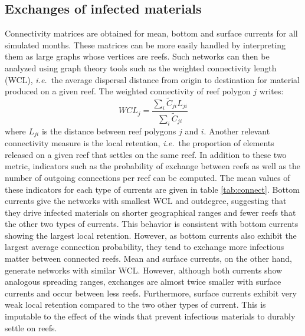 \documentclass[utf8]{frontiersSCNS}
\newcommand{\ie}{{\it i.e.}\ }
\begin{document}
\subsection{Exchanges of infected materials}
Connectivity matrices are obtained for mean, bottom and surface currents for all simulated months. These matrices can be more easily handled by interpreting them as large graphs whose vertices are reefs. Such networks can then be analyzed using graph theory tools such as the weighted connectivity length (WCL), \ie the average dispersal distance from origin to destination for material produced on a given reef. The weighted connectivity of reef polygon $j$ writes:
\begin{equation}
    WCL_j = \dfrac{\sum_i \tilde{C}_{ji} L_{ji}}{\sum_i \tilde{C}_{ji}}
\end{equation}
where $L_{ji}$ is the distance between reef polygons $j$ and $i$. Another relevant connectivity measure is the local retention, \ie the proportion of elements released on a given reef that settles on the same reef. In addition to these two metric, indicators such as the probability of exchange between reefs as well as the number of outgoing connections per reef can be computed. The mean values of these indicators for each type of currents are given in table \ref{tab:connect}. Bottom currents give the networks with smallest WCL and outdegree, suggesting that they drive infected materials on shorter geographical ranges and fewer reefs that the other two types of currents. This behavior is consistent with bottom currents showing the largest local retention. However, as bottom currents also exhibit the largest average connection probability, they tend to exchange more infectious matter between connected reefs. Mean and surface currents, on the other hand, generate networks with similar WCL. However, although both currents show analogous spreading ranges, exchanges are almost twice smaller with surface currents and occur between less reefs. Furthermore, surface currents exhibit very weak local retention compared to the two other types of current. This is imputable to the effect of the winds that prevent infectious materials to durably settle on reefs.
\end{document}
